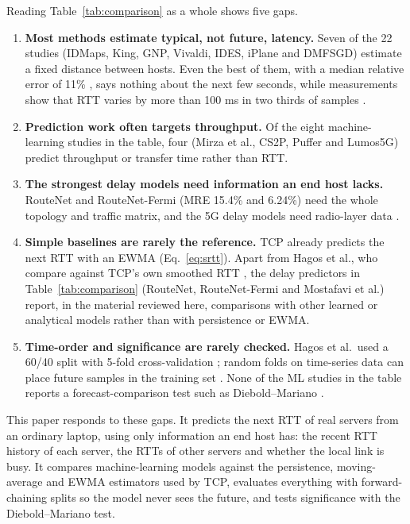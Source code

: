 \documentclass[pdflatex,sn-mathphys-num]{sn-jnl}
\begin{document}
Reading Table~\ref{tab:comparison} as a whole shows five gaps.
\begin{enumerate}
\item \textbf{Most methods estimate typical, not future, latency.} Seven of the 22 studies (IDMaps, King, GNP, Vivaldi, IDES, iPlane and DMFSGD) estimate a fixed distance between hosts. Even the best of them, with a median relative error of 11\% \cite{dabek2004vivaldi}, says nothing about the next few seconds, while measurements show that RTT varies by more than 100 ms in two thirds of samples \cite{hoiland2016latency}.
\item \textbf{Prediction work often targets throughput.} Of the eight machine-learning studies in the table, four (Mirza et al., CS2P, Puffer and Lumos5G) predict throughput or transfer time rather than RTT.
\item \textbf{The strongest delay models need information an end host lacks.} RouteNet and RouteNet-Fermi (MRE 15.4\% and 6.24\%) need the whole topology and traffic matrix, and the 5G delay models need radio-layer data \cite{rusek2020routenet,ferriol2023fermi,mostafavi2025delay}.
\item \textbf{Simple baselines are rarely the reference.} TCP already predicts the next RTT with an EWMA (Eq.~\ref{eq:srtt}). Apart from Hagos et al., who compare against TCP's own smoothed RTT \cite{hagos2019rtt}, the delay predictors in Table~\ref{tab:comparison} (RouteNet, RouteNet-Fermi and Mostafavi et al.) report, in the material reviewed here, comparisons with other learned or analytical models rather than with persistence or EWMA.
\item \textbf{Time-order and significance are rarely checked.} Hagos et al.\ used a 60/40 split with 5-fold cross-validation \cite{hagos2019rtt}; random folds on time-series data can place future samples in the training set \cite{bergmeir2012cv,cerqueira2020eval}. None of the ML studies in the table reports a forecast-comparison test such as Diebold--Mariano \cite{diebold1995dm}.
\end{enumerate}

This paper responds to these gaps. It predicts the next RTT of real servers from an ordinary laptop, using only information an end host has: the recent RTT history of each server, the RTTs of other servers and whether the local link is busy. It compares machine-learning models against the persistence, moving-average and EWMA estimators used by TCP, evaluates everything with forward-chaining splits so the model never sees the future, and tests significance with the Diebold--Mariano test.
\end{document}
